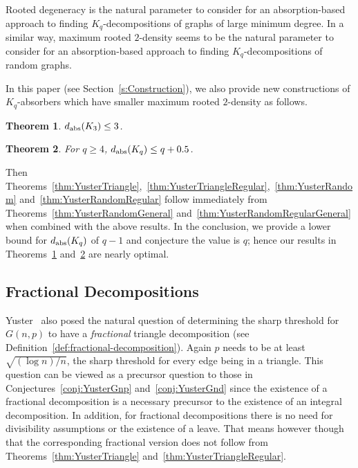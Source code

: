 \documentclass[11pt]{article}
\numberwithin{equation}{section}
\newcounter{i}
\theoremstyle{plain}
\newtheorem{thm}{Theorem}[section]
\theoremstyle{plain} %
\theoremstyle{definition}
\begin{document}
Rooted degeneracy is the natural parameter to consider for an absorption-based approach to finding $K_q$-decompositions of graphs of large minimum degree.  In a similar way, maximum rooted $2$-density seems to be the natural parameter to consider for an absorption-based approach to finding $K_q$-decompositions of random graphs.

In this paper (see Section~\ref{s:Construction}), we also provide new constructions of $K_q$-absorbers which have smaller maximum rooted $2$-density as follows.

\begin{thm}\label{thm:GeneralTriangleAbsorberThreshold}
$d_{{\rm abs}}(K_3) \le 3$.    
\end{thm}

\begin{thm}\label{thm:GeneralQAbsorberThreshold}
For $q\ge 4$, $d_{{\rm abs}}(K_q) \le q+ 0.5$.    
\end{thm}

Then Theorems~\ref{thm:YusterTriangle},~\ref{thm:YusterTriangleRegular},~\ref{thm:YusterRandom} and~\ref{thm:YusterRandomRegular} follow immediately from Theorems~\ref{thm:YusterRandomGeneral} and~\ref{thm:YusterRandomRegularGeneral} when combined with the above results. In the conclusion, we provide a lower bound for $d_{\rm abs}(K_q)$ of $q-1$ and conjecture the value is $q$; hence our results in Theorems~\ref{thm:GeneralTriangleAbsorberThreshold} and~\ref{thm:GeneralQAbsorberThreshold} are nearly optimal.

\subsection{Fractional Decompositions}

Yuster~\cite[Problem 4.10]{Yu07} also posed the natural question of determining the sharp threshold for $G(n,p)$ to have a \textit{fractional} triangle decomposition (see Definition~\ref{def:fractional-decomposition}). 
Again $p$ needs to be at least $\sqrt{(\log n)/n}$, the sharp threshold for every edge being in a triangle. This question can be viewed as a precursor question to those in Conjectures~\ref{conj:YusterGnp} and~\ref{conj:YusterGnd} since the existence of a fractional decomposition is a necessary precursor to the existence of an integral decomposition. In addition, for fractional decompositions there is no need for divisibility assumptions or the existence of a leave. That means however though that the corresponding fractional version does not follow from Theorems~\ref{thm:YusterTriangle} and~\ref{thm:YusterTriangleRegular}.
\end{document}
